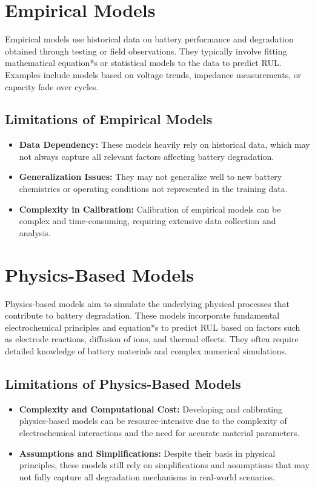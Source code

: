 \section{Empirical Models}

Empirical models use historical data on battery performance and degradation obtained through testing or field observations. They typically involve fitting mathematical equation*s or statistical models to the data to predict RUL. Examples include models based on voltage trends, impedance measurements, or capacity fade over cycles.

\subsection{Limitations of Empirical Models}

\begin{itemize}
    \item \textbf{Data Dependency:} These models heavily rely on historical data, which may not always capture all relevant factors affecting battery degradation.
    \item \textbf{Generalization Issues:} They may not generalize well to new battery chemistries or operating conditions not represented in the training data.
    \item \textbf{Complexity in Calibration:} Calibration of empirical models can be complex and time-consuming, requiring extensive data collection and analysis.
\end{itemize}

\section{Physics-Based Models}

Physics-based models aim to simulate the underlying physical processes that contribute to battery degradation. These models incorporate fundamental electrochemical principles and equation*s to predict RUL based on factors such as electrode reactions, diffusion of ions, and thermal effects. They often require detailed knowledge of battery materials and complex numerical simulations.

\subsection{Limitations of Physics-Based Models}

\begin{itemize}
    \item \textbf{Complexity and Computational Cost:} Developing and calibrating physics-based models can be resource-intensive due to the complexity of electrochemical interactions and the need for accurate material parameters.
    \item \textbf{Assumptions and Simplifications:} Despite their basis in physical principles, these models still rely on simplifications and assumptions that may not fully capture all degradation mechanisms in real-world scenarios.
\end{itemize}

